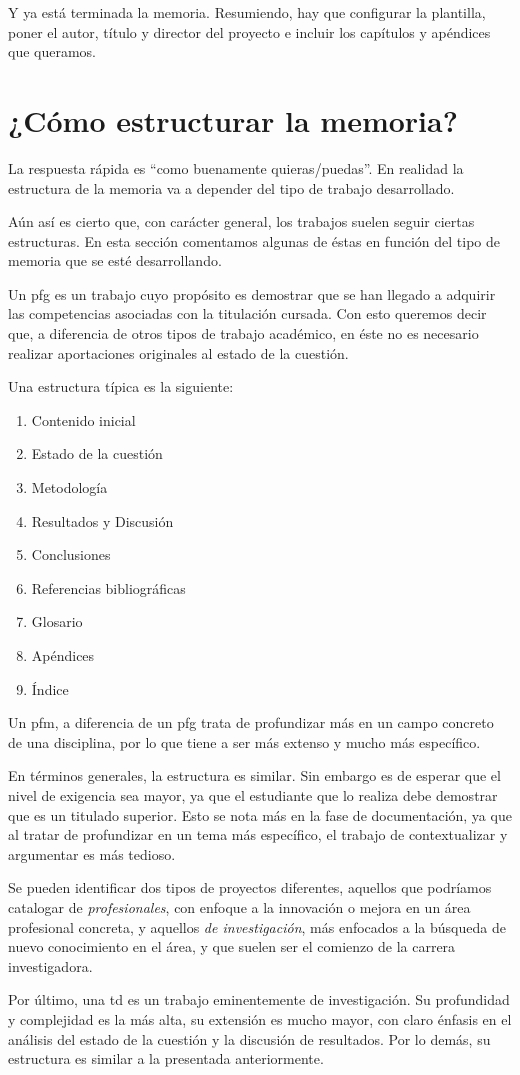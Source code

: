 Y ya está terminada la memoria. Resumiendo, hay que configurar la plantilla, poner el autor, título y director del proyecto e incluir los capítulos y apéndices que queramos.

\section{¿Cómo estructurar la memoria?}

La respuesta rápida es ``como buenamente quieras/puedas''. En realidad la estructura de la memoria va a depender del tipo de trabajo desarrollado.

Aún así es cierto que, con carácter general, los trabajos suelen seguir ciertas estructuras. En esta sección comentamos algunas de éstas en función del tipo de memoria que se esté desarrollando.

Un \gls{pfg} es un trabajo cuyo propósito es demostrar que se han llegado a adquirir las competencias asociadas con la titulación cursada. Con esto queremos decir que, a diferencia de otros tipos de trabajo académico, en éste no es necesario realizar aportaciones originales al estado de la cuestión.

Una estructura típica es la siguiente:

\begin{enumerate}
    \item Contenido inicial
    \item Estado de la cuestión
    \item Metodología
    \item Resultados y Discusión
    \item Conclusiones
    \item Referencias bibliográficas
    \item Glosario
    \item Apéndices
    \item Índice
\end{enumerate}

Un \gls{pfm}, a diferencia de un \gls{pfg} trata de profundizar más en un campo concreto de una disciplina, por lo que tiene a ser más extenso y mucho más específico.

En términos generales, la estructura es similar. Sin embargo es de esperar que el nivel de exigencia sea mayor, ya que el estudiante que lo realiza debe demostrar que es un titulado superior. Esto se nota más en la fase de documentación, ya que al tratar de profundizar en un tema más específico, el trabajo de contextualizar y argumentar es más tedioso.

Se pueden identificar dos tipos de proyectos diferentes, aquellos que podríamos catalogar de \textit{profesionales}, con enfoque a la innovación o mejora en un área profesional concreta, y aquellos \textit{de investigación}, más enfocados a la búsqueda de nuevo conocimiento en el área, y que suelen ser el comienzo de la carrera investigadora.

Por último, una \gls{td} es un trabajo eminentemente de investigación. Su profundidad y complejidad es la más alta, su extensión es mucho mayor, con claro énfasis en el análisis del estado de la cuestión y la discusión de resultados. Por lo demás, su estructura es similar a la presentada anteriormente.